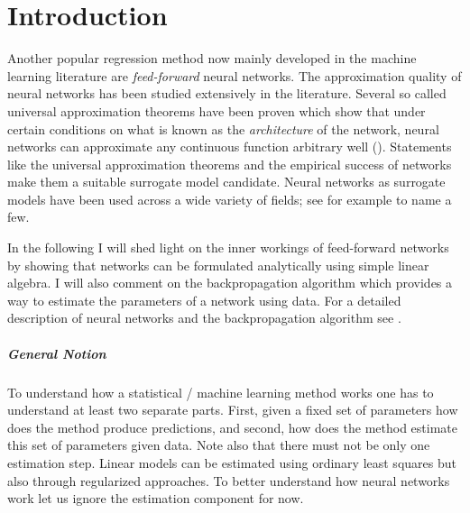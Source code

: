 \section{Introduction}

Another popular regression method now mainly developed in the machine learning
literature are \emph{feed-forward} neural networks. The approximation quality of neural
networks has been studied extensively in the literature. Several so called universal
approximation theorems have been proven which show that under certain conditions on what
is known as the \emph{architecture} of the network, neural networks can approximate any
continuous function arbitrary well (\cite{Hornik.1991}). Statements like the universal
approximation theorems and the empirical success of networks make them a suitable
surrogate model candidate. Neural networks as surrogate models have been used across a
wide variety of fields; see for example \cite{Holena.2010, Gang.2019, Tripathy.2018} to
name a few.

In the following I will shed light on the inner workings of feed-forward networks by
showing that networks can be formulated analytically using simple linear algebra. I will
also comment on the backpropagation algorithm which provides a way to estimate the
parameters of a network using data. For a detailed description of neural networks and
the backpropagation algorithm see \cite{Goodfellow.2016, Murphy.2012, Hastie.2008}.

\subparagraph{General Notion}

To understand how a statistical / machine learning method works one has to understand at
least two separate parts. First, given a fixed set of parameters how does the method
produce predictions, and second, how does the method estimate this set of parameters
given data. Note also that there must not be only one estimation step. Linear models can
be estimated using ordinary least squares but also through regularized approaches. To
better understand how neural networks work let us ignore the estimation component for
now.

